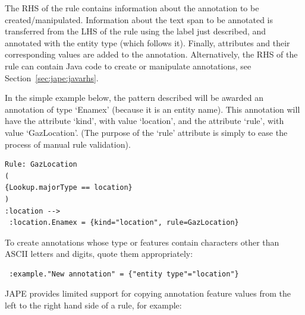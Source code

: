 
The RHS of the rule contains information about the annotation to be
created/manipulated. Information about the text span to be annotated is
transferred from the LHS of the rule using the label just described, and
annotated with the entity type (which follows it). Finally, attributes and their
corresponding values are added to the annotation. Alternatively, the RHS of the
rule can contain Java code to create or manipulate annotations, see
Section~\ref{sec:jape:javarhs}.


In the simple example below, the pattern described will be
awarded an annotation of type `Enamex' (because it is an entity
name). This annotation will have the attribute `kind', with value
`location', and the attribute `rule', with value `GazLocation'. (The
purpose of the `rule' attribute is simply to ease the process of manual
rule validation).

\begin{small}
\begin{verbatim}
Rule: GazLocation
(
{Lookup.majorType == location}
)
:location -->
 :location.Enamex = {kind="location", rule=GazLocation}
\end{verbatim}
\end{small}

To create annotations whose type or features contain characters other
than ASCII letters and digits, quote them appropriately:

\begin{small}
\begin{verbatim}
 :example."New annotation" = {"entity type"="location"}
\end{verbatim}
\end{small}


JAPE provides limited support for copying annotation feature values from the
left to the right hand side of a rule, for example:

